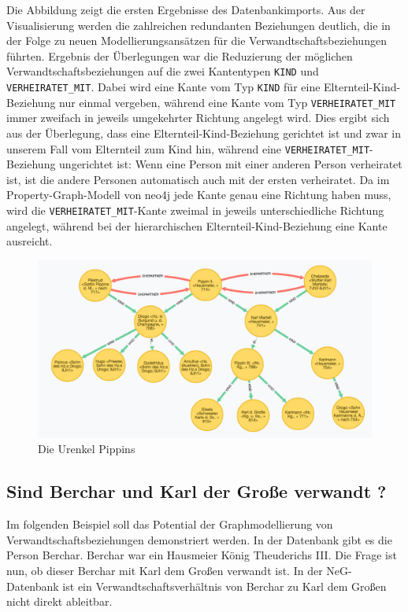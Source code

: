 Die Abbildung zeigt die ersten Ergebnisse des Datenbankimports. Aus der
Visualisierung werden die zahlreichen redundanten Beziehungen deutlich,
die in der Folge zu neuen Modellierungsansätzen für die
Verwandtschaftsbeziehungen führten. Ergebnis der Überlegungen war die
Reduzierung der möglichen Verwandtschaftsbeziehungen auf die zwei
Kantentypen \texttt{KIND} und \texttt{VERHEIRATET\_MIT}. Dabei wird eine
Kante vom Typ \texttt{KIND} für eine Elternteil-Kind-Beziehung nur
einmal vergeben, während eine Kante vom Typ \texttt{VERHEIRATET\_MIT}
immer zweifach in jeweils umgekehrter Richtung angelegt wird. Dies
ergibt sich aus der Überlegung, dass eine Elternteil-Kind-Beziehung
gerichtet ist und zwar in unserem Fall vom Elternteil zum Kind hin,
während eine \texttt{VERHEIRATET\_MIT}-Beziehung ungerichtet ist: Wenn
eine Person mit einer anderen Person verheiratet ist, ist die andere
Personen automatisch auch mit der ersten verheiratet. Da im
Property-Graph-Modell von neo4j jede Kante genau eine Richtung haben
muss, wird die \texttt{VERHEIRATET\_MIT}-Kante zweimal in jeweils
unterschiedliche Richtung angelegt, während bei der hierarchischen
Elternteil-Kind-Beziehung eine Kante ausreicht.

\begin{figure}
\centering
\includegraphics{Bilder/NeG/030-Urenkel-Pippins.jpg}
\caption{Die Urenkel Pippins}
\end{figure}

\hypertarget{sind-berchar-und-karl-der-grouxdfe-verwandt}{%
\subsection{Sind Berchar und Karl der Große verwandt
?}\label{sind-berchar-und-karl-der-grouxdfe-verwandt}}

Im folgenden Beispiel soll das Potential der Graphmodellierung von
Verwandtschaftsbeziehungen demonstriert werden. In der Datenbank gibt es
die Person Berchar. Berchar war ein Hausmeier König Theuderichs III. Die
Frage ist nun, ob dieser Berchar mit Karl dem Großen verwandt ist. In
der NeG-Datenbank ist ein Verwandtschaftsverhältnis von Berchar zu Karl
dem Großen nicht direkt ableitbar.

